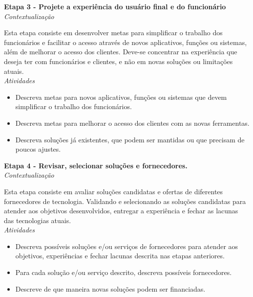 \textbf{Etapa 3 - Projete a experiência do usuário final e do funcionário}\\

\textit{Contextualização}

Esta etapa consiste em desenvolver metas para simplificar o trabalho dos funcionários e facilitar o acesso através de novos aplicativos, funções ou sistemas, além de melhorar o acesso dos clientes. Deve-se concentrar na experiência que deseja ter com funcionários e clientes, e não em novas soluções ou limitações atuais.\\

\textit{Atividades}
\begin{itemize}
    \item Descreva metas para novos aplicativos, funções ou sistemas que devem simplificar o trabalho dos funcionários.

    \item Descreva metas para melhorar o acesso dos clientes com as novas ferramentas.

    \item Descreva soluções já existentes, que podem ser mantidas ou que precisam de poucos ajustes.
\end{itemize}

\textbf{Etapa 4 - Revisar, selecionar soluções e fornecedores.}\\

\textit{Contextualização}

Esta etapa consiste em avaliar soluções candidatas e ofertas de diferentes fornecedores de tecnologia. Validando e selecionando as soluções candidatas para atender aos objetivos desenvolvidos, entregar a experiência e fechar as lacunas das tecnologias atuais.\\

\textit{Atividades}
\begin{itemize}
    \item Descreva possíveis soluções e/ou serviços de fornecedores para atender aos objetivos, experiências e fechar lacunas descrita nas etapas anteriores.

    \item Para cada solução e/ou serviço descrito, descreva possíveis fornecedores.

    \item Descreve de que maneira novas soluções podem ser financiadas.
\end{itemize}
